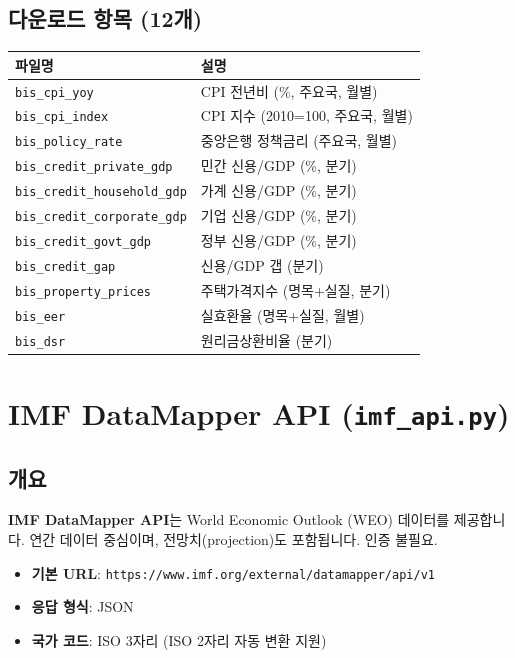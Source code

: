 \documentclass[11pt,a4paper]{article}
\newcommand{\code}[1]{\texttt{#1}}
\newcommand{\file}[1]{\texttt{\textcolor{string}{#1}}}
\begin{document}
\subsection{다운로드 항목 (12개)}

\begin{longtable}{l l}
\toprule
\textbf{파일명} & \textbf{설명} \\
\midrule
\endhead
\file{bis\_cpi\_yoy}              & CPI 전년비 (\%, 주요국, 월별) \\
\file{bis\_cpi\_index}            & CPI 지수 (2010=100, 주요국, 월별) \\
\file{bis\_policy\_rate}          & 중앙은행 정책금리 (주요국, 월별) \\
\file{bis\_credit\_private\_gdp}  & 민간 신용/GDP (\%, 분기) \\
\file{bis\_credit\_household\_gdp}& 가계 신용/GDP (\%, 분기) \\
\file{bis\_credit\_corporate\_gdp}& 기업 신용/GDP (\%, 분기) \\
\file{bis\_credit\_govt\_gdp}     & 정부 신용/GDP (\%, 분기) \\
\file{bis\_credit\_gap}           & 신용/GDP 갭 (분기) \\
\file{bis\_property\_prices}      & 주택가격지수 (명목+실질, 분기) \\
\file{bis\_eer}                   & 실효환율 (명목+실질, 월별) \\
\file{bis\_dsr}                   & 원리금상환비율 (분기) \\
\bottomrule
\end{longtable}


\section{IMF DataMapper API (\file{imf\_api.py})}

\subsection{개요}

\textbf{IMF DataMapper API}는 World Economic Outlook (WEO) 데이터를 제공합니다.
연간 데이터 중심이며, 전망치(projection)도 포함됩니다. 인증 불필요.

\begin{itemize}[leftmargin=2em]
    \item \textbf{기본 URL}: \code{https://www.imf.org/external/datamapper/api/v1}
    \item \textbf{응답 형식}: JSON
    \item \textbf{국가 코드}: ISO 3자리 (ISO 2자리 자동 변환 지원)
\end{itemize}
\end{document}
